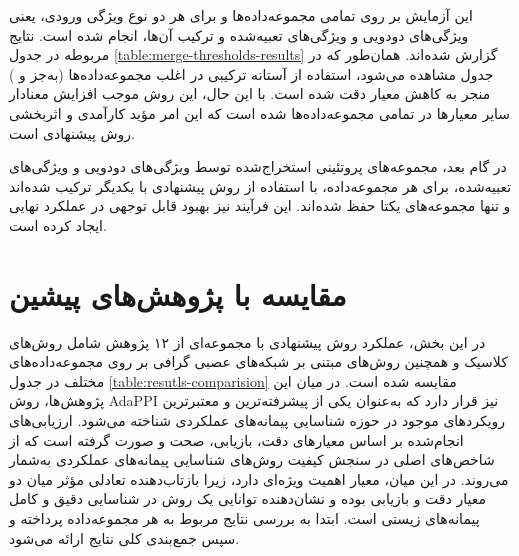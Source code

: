 این آزمایش بر روی تمامی مجموعه‌داده‌ها و برای هر دو نوع ویژگی ورودی، یعنی ویژگی‌های دودویی و ویژگی‌های تعبیه‌شده و ترکیب آن‌ها، انجام شده است. نتایج مربوطه در جدول \ref{table:merge-thresholds-results} گزارش شده‌اند. همان‌طور که در جدول مشاهده می‌شود، استفاده از آستانه ترکیبی در اغلب مجموعه‌داده‌ها (به‌جز  و ) منجر به کاهش معیار دقت شده است. با این حال، این روش موجب افزایش معنادار سایر معیارها در تمامی مجموعه‌داده‌ها شده است که این امر مؤید کارآمدی و اثربخشی روش پیشنهادی است.

در گام بعد، مجموعه‌های پروتئینی استخراج‌شده توسط ویژگی‌های دودویی و ویژگی‌های تعبیه‌شده، برای هر مجموعه‌داده، با استفاده از روش پیشنهادی با یکدیگر ترکیب شده‌اند و تنها مجموعه‌های یکتا حفظ شده‌اند. این فرآیند نیز بهبود قابل توجهی در عملکرد نهایی ایجاد کرده است.

\section{مقایسه با پژوهش‌های پیشین}

در این بخش، عملکرد روش پیشنهادی با مجموعه‌ای از ۱۲ پژوهش شامل روش‌های کلاسیک و همچنین روش‌های مبتنی بر شبکه‌های عصبی گرافی بر روی مجموعه‌داده‌های مختلف در جدول \ref{table:resutls-comparision} مقایسه شده است. در میان این پژوهش‌ها، روش AdaPPI نیز قرار دارد که به‌عنوان یکی از پیشرفته‌ترین و معتبرترین رویکردهای موجود در حوزه شناسایی پیمانه‌های عملکردی شناخته می‌شود. ارزیابی‌های انجام‌شده بر اساس معیارهای دقت، بازیابی، صحت و  صورت گرفته است که از شاخص‌های اصلی در سنجش کیفیت روش‌های شناسایی پیمانه‌های عملکردی به‌شمار می‌روند. در این میان، معیار  اهمیت ویژه‌ای دارد، زیرا بازتاب‌دهنده تعادلی مؤثر میان دو معیار دقت و بازیابی بوده و نشان‌دهنده توانایی یک روش در شناسایی دقیق و کامل پیمانه‌های زیستی است. ابتدا به بررسی نتایج مربوط به هر مجموعه‌داده پرداخته و سپس جمع‌بندی کلی نتایج ارائه می‌شود.

